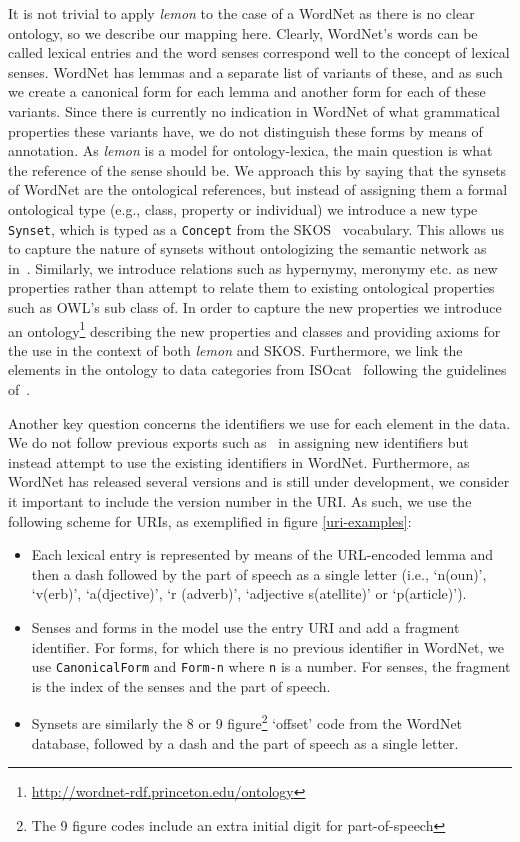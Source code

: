 \documentclass[10pt, a4paper]{article}
\newcommand{\lemon}[0]{\emph{lemon}}
\begin{document}
It is not trivial to apply \lemon{} to the case of a WordNet as there is no
clear ontology, so we describe our mapping here.
Clearly, WordNet's 
words can be called lexical entries and the word senses correspond
well to the concept of lexical senses. WordNet has lemmas and a separate list of
variants of these, and as such we create a canonical form for each lemma and another 
form for each of these variants. Since there is currently no indication in
WordNet of what grammatical properties these variants have, we do not distinguish
these forms by means of annotation. As \lemon{} is a model for
ontology-lexica, the main question is what the reference of the sense should be.
We approach this by saying that the synsets of WordNet are the ontological
references, but instead of assigning them a formal ontological type (e.g.,
class, property or individual) we introduce a new type {\tt Synset},
which is typed as a {\tt Concept} from the SKOS~\cite{miles2007skos} vocabulary.
This allows us to capture the nature of synsets without
ontologizing the semantic network as in~\cite{gangemi2003ontowordnet}.
Similarly, we introduce relations such as hypernymy, meronymy etc. as new
properties rather than attempt to relate them to existing ontological
properties such as OWL's sub class of. In order to capture the new properties we
introduce an ontology\footnote{\url{http://wordnet-rdf.princeton.edu/ontology}}
describing the new properties and classes and providing
axioms for the use in the context of both \lemon{} and SKOS. Furthermore, we
link the elements in the ontology to data categories from
ISOcat~\cite{kemps2008isocat} following the guidelines
of~\cite{windhouwer2012linking}.

Another key question concerns the identifiers we use for each element in the data.
We do not follow previous exports such as~\cite{van2006conversion} in assigning new identifiers
but instead attempt to use the existing identifiers in WordNet. Furthermore, as
WordNet has released several versions and is still under development, we consider it 
important to include the version number in the URI. As such, we use the
following scheme for URIs, as exemplified in figure \ref{uri-examples}:

\begin{itemize}
  \item Each lexical entry is represented by means of the URL-encoded lemma and
    then a dash followed by the part of speech as a single letter (i.e., `n(oun)',
    `v(erb)', `a(djective)', `r (adverb)', `adjective s(atellite)' or `p(article)').
  \item Senses and forms in the model use the entry URI and add a fragment
    identifier. For forms, for which there is no previous identifier in WordNet, we
    use {\tt CanonicalForm} and {\tt Form-n} where {\tt n} is a number.
    For senses, the fragment is the index of the senses and the part of
    speech.
  \item Synsets are similarly the 8 or 9 figure\footnote{The 9 figure codes
      include an extra initial digit for part-of-speech} `offset' code from the WordNet
    database, followed by a dash and the part of speech as a single letter.
\end{itemize}
\end{document}
